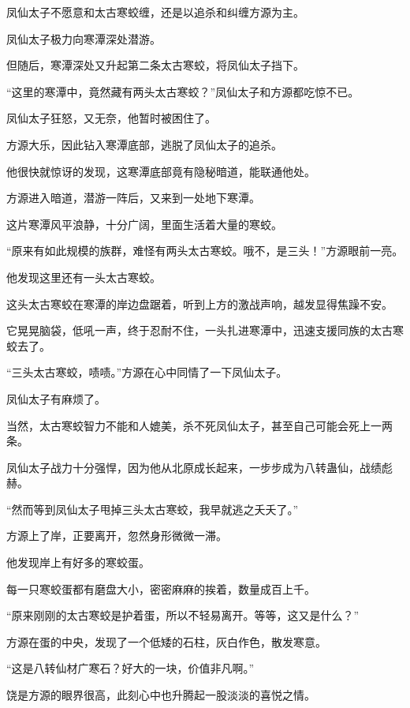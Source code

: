 
\begin{this_body}

凤仙太子不愿意和太古寒蛟缠，还是以追杀和纠缠方源为主。

凤仙太子极力向寒潭深处潜游。

但随后，寒潭深处又升起第二条太古寒蛟，将凤仙太子挡下。

“这里的寒潭中，竟然藏有两头太古寒蛟？”凤仙太子和方源都吃惊不已。

凤仙太子狂怒，又无奈，他暂时被困住了。

方源大乐，因此钻入寒潭底部，逃脱了凤仙太子的追杀。

他很快就惊讶的发现，这寒潭底部竟有隐秘暗道，能联通他处。

方源进入暗道，潜游一阵后，又来到一处地下寒潭。

这片寒潭风平浪静，十分广阔，里面生活着大量的寒蛟。

“原来有如此规模的族群，难怪有两头太古寒蛟。哦不，是三头！”方源眼前一亮。

他发现这里还有一头太古寒蛟。

这头太古寒蛟在寒潭的岸边盘踞着，听到上方的激战声响，越发显得焦躁不安。

它晃晃脑袋，低吼一声，终于忍耐不住，一头扎进寒潭中，迅速支援同族的太古寒蛟去了。

“三头太古寒蛟，啧啧。”方源在心中同情了一下凤仙太子。

凤仙太子有麻烦了。

当然，太古寒蛟智力不能和人媲美，杀不死凤仙太子，甚至自己可能会死上一两条。

凤仙太子战力十分强悍，因为他从北原成长起来，一步步成为八转蛊仙，战绩彪赫。

“然而等到凤仙太子甩掉三头太古寒蛟，我早就逃之夭夭了。”

方源上了岸，正要离开，忽然身形微微一滞。

他发现岸上有好多的寒蛟蛋。

每一只寒蛟蛋都有磨盘大小，密密麻麻的挨着，数量成百上千。

“原来刚刚的太古寒蛟是护着蛋，所以不轻易离开。等等，这又是什么？”

方源在蛋的中央，发现了一个低矮的石柱，灰白作色，散发寒意。

“这是八转仙材广寒石？好大的一块，价值非凡啊。”

饶是方源的眼界很高，此刻心中也升腾起一股淡淡的喜悦之情。


\end{this_body}
